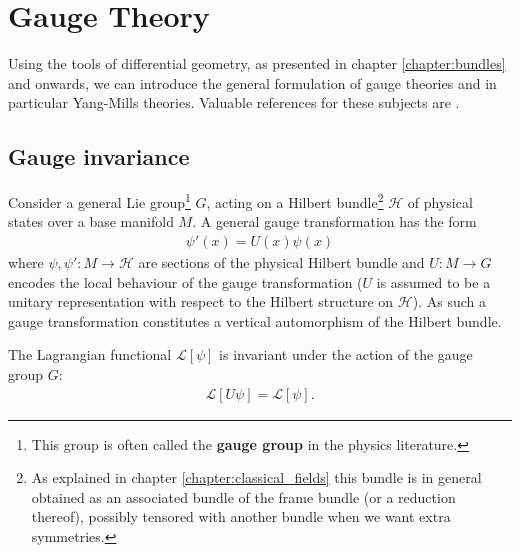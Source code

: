 \chapter{Gauge Theory}\label{chapter:gauge_theory}

    Using the tools of differential geometry, as presented in chapter \ref{chapter:bundles} and onwards, we can introduce the general formulation of gauge theories and in particular Yang-Mills theories. Valuable references for these subjects are \cite{principal_bundles,sen_nash,schuller,gauge1}.

\section{Gauge invariance}

    Consider a general Lie group\footnote{This group is often called the \textbf{gauge group} in the physics literature.} $G$, acting on a Hilbert bundle\footnote{As explained in chapter \ref{chapter:classical_fields} this bundle is in general obtained as an associated bundle of the frame bundle (or a reduction thereof), possibly tensored with another bundle when we want extra symmetries.} $\mathcal{H}$ of physical states over a base manifold $M$. A general gauge transformation has the form
    \begin{gather}
        \label{qft:gauge_transformation}
        \psi'(x) = U(x)\psi(x)
    \end{gather}
    where $\psi, \psi':M\rightarrow\mathcal{H}$ are sections of the physical Hilbert bundle and $U:M\rightarrow G$ encodes the local behaviour of the gauge transformation ($U$ is assumed to be a unitary representation with respect to the Hilbert structure on $\mathcal{H}$). As such a gauge transformation constitutes a vertical automorphism of the Hilbert bundle.

    \begin{axiom}
        The Lagrangian functional $\mathcal{L}[\psi]$ is invariant under the action of the gauge group $G$:
        \begin{gather}
            \mathcal{L}[U\psi] = \mathcal{L}[\psi].
        \end{gather}
    \end{axiom}


